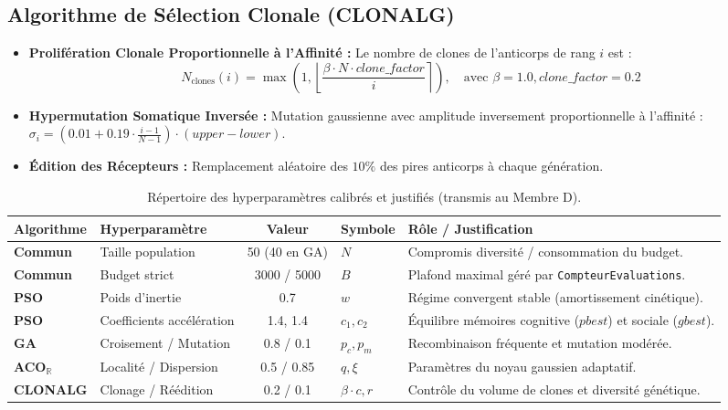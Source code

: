 \documentclass[11pt,a4paper]{article}
\begin{document}
\subsection{Algorithme de Sélection Clonale (CLONALG)}
\begin{itemize}\setlength{\itemsep}{0.1em}
    \item \textbf{Prolifération Clonale Proportionnelle à l'Affinité :} Le nombre de clones de l'anticorps de rang $i$ est :
    \begin{equation}
        N_{\text{clones}}(i) = \max\left( 1, \left\lfloor \frac{\beta \cdot N \cdot clone\_factor}{i} \right\rceil \right), \quad \text{avec } \beta=1.0, clone\_factor=0.2
    \end{equation}
    \item \textbf{Hypermutation Somatique Inversée :} Mutation gaussienne avec amplitude inversement proportionnelle à l'affinité : $\sigma_i = (0.01 + 0.19 \cdot \frac{i-1}{N-1}) \cdot (upper - lower)$.
    \item \textbf{Édition des Récepteurs :} Remplacement aléatoire des $10\%$ des pires anticorps à chaque génération.
\end{itemize}

\begin{table}[H]
\centering
\small
\begin{tabularx}{\textwidth}{llclX}
\toprule
\textbf{Algorithme} & \textbf{Hyperparamètre} & \textbf{Valeur} & \textbf{Symbole} & \textbf{Rôle / Justification} \\
\midrule
\textbf{Commun} & Taille population & 50 (40 en GA) & $N$ & Compromis diversité / consommation du budget. \\
\textbf{Commun} & Budget strict & 3000 / 5000 & $B$ & Plafond maximal géré par \texttt{CompteurEvaluations}. \\
\textbf{PSO} & Poids d'inertie & 0.7 & $w$ & Régime convergent stable (amortissement cinétique). \\
\textbf{PSO} & Coefficients accélération & 1.4, 1.4 & $c_1, c_2$ & Équilibre mémoires cognitive ($pbest$) et sociale ($gbest$). \\
\textbf{GA} & Croisement / Mutation & 0.8 / 0.1 & $p_c, p_m$ & Recombinaison fréquente et mutation modérée. \\
\textbf{ACO}$_\mathbb{R}$ & Localité / Dispersion & 0.5 / 0.85 & $q, \xi$ & Paramètres du noyau gaussien adaptatif. \\
\textbf{CLONALG} & Clonage / Réédition & 0.2 / 0.1 & $\beta \cdot c, r$ & Contrôle du volume de clones et diversité génétique. \\
\bottomrule
\end{tabularx}
\caption{Répertoire des hyperparamètres calibrés et justifiés (transmis au Membre D).}
\label{tab:hyperparametres}
\end{table}
\end{document}

